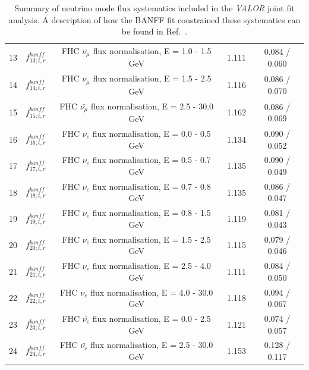 {\begin{table}
\begin{tabular}{| c | c | c | c | c |}
13     &$f_{13; t, r}^{banff}$     & FHC $\bar{\nu_\mu}$ flux normalisation, E = 1.0 - 1.5 GeV   & 1.111   & 0.084 / 0.060 \\ 
14     &$f_{14; t, r}^{banff}$     & FHC $\bar{\nu_\mu}$ flux normalisation, E = 1.5 - 2.5 GeV   & 1.116   & 0.086 / 0.070 \\ 
15     &$f_{15; t, r}^{banff}$     & FHC $\bar{\nu_\mu}$ flux normalisation, E = 2.5 - 30.0 GeV  & 1.162   & 0.086 / 0.069 \\ 
16     &$f_{16; t, r}^{banff}$     & FHC $\nu_e$ flux normalisation, E = 0.0 - 0.5 GeV           & 1.134   & 0.090 / 0.052 \\ 
17     &$f_{17; t, r}^{banff}$     & FHC $\nu_e$ flux normalisation, E = 0.5 - 0.7 GeV           & 1.135   & 0.090 / 0.049 \\ 
18     &$f_{18; t, r}^{banff}$     & FHC $\nu_e$ flux normalisation, E = 0.7 - 0.8 GeV           & 1.135   & 0.086 / 0.047 \\ 
19     &$f_{19; t, r}^{banff}$     & FHC $\nu_e$ flux normalisation, E = 0.8 - 1.5 GeV           & 1.119   & 0.081 / 0.043 \\ 
20     &$f_{20; t, r}^{banff}$     & FHC $\nu_e$ flux normalisation, E = 1.5 - 2.5 GeV           & 1.115   & 0.079 / 0.046 \\ 
21     &$f_{21; t, r}^{banff}$     & FHC $\nu_e$ flux normalisation, E = 2.5 - 4.0 GeV           & 1.111   & 0.084 / 0.050 \\ 
22     &$f_{22; t, r}^{banff}$     & FHC $\nu_e$ flux normalisation, E = 4.0 - 30.0 GeV          & 1.118   & 0.094 / 0.067 \\ 
23     &$f_{23; t, r}^{banff}$     & FHC $\bar{\nu_e}$ flux normalisation, E = 0.0 - 2.5 GeV     & 1.121   & 0.074 / 0.057 \\ 
24     &$f_{24; t, r}^{banff}$     & FHC $\bar{\nu_e}$ flux normalisation, E = 2.5 - 30.0 GeV    & 1.153   & 0.128 / 0.117 \\ 

\hline

\end{tabular}

\caption{
Summary of neutrino mode flux systematics included in the {\em VALOR} joint fit analysis.
A description of how the BANFF fit constrained these systematics can be found in Ref.~\cite{BANFF2015}.
}
\label{tab:banff_uncertainties_flux_fhc}

\end{table}


}
